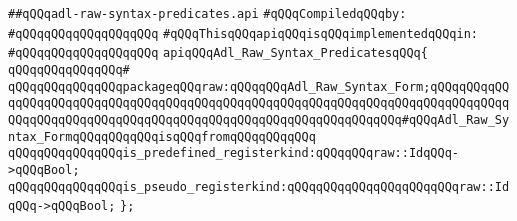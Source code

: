 \label{src/lib/compiler/back/low/tools/arch/adl-raw-syntax-predicates.api}
\verb|##qQQqadl-raw-syntax-predicates.api|\newline
\newline
\verb|#qQQqCompiledqQQqby:|\newline
\verb|#qQQqqQQqqQQqqQQqqQQq|\newline
\newline
\verb|#qQQqThisqQQqapiqQQqisqQQqimplementedqQQqin:|\newline
\verb|#qQQqqQQqqQQqqQQqqQQq|\newline
\newline
\verb|apiqQQqAdl_Raw_Syntax_PredicatesqQQq{|\newline
\verb|qQQqqQQqqQQqqQQq#|\newline
\verb|qQQqqQQqqQQqqQQqpackageqQQqraw:qQQqqQQqAdl_Raw_Syntax_Form;qQQqqQQqqQQqqQQqqQQqqQQqqQQqqQQqqQQqqQQqqQQqqQQqqQQqqQQqqQQqqQQqqQQqqQQqqQQqqQQqqQQqqQQqqQQqqQQqqQQqqQQqqQQqqQQqqQQqqQQqqQQqqQQqqQQqqQQq#qQQqAdl_Raw_Syntax_FormqQQqqQQqqQQqisqQQqfromqQQqqQQqqQQq|\newline
\newline
\verb|qQQqqQQqqQQqqQQqis_predefined_registerkind:qQQqqQQqraw::IdqQQq->qQQqBool;|\newline
\verb|qQQqqQQqqQQqqQQqis_pseudo_registerkind:qQQqqQQqqQQqqQQqqQQqqQQqraw::IdqQQq->qQQqBool;|\newline
\verb|};|\newline
\newline

